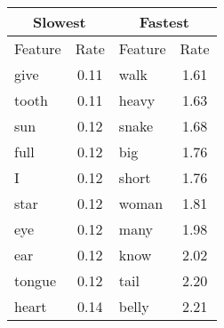 \begin{tabular}{|l|c||l|c|}
    \hline
    \multicolumn{2}{|c||}{Slowest} & \multicolumn{2}{|c|}{Fastest} \\ \hline
    Feature & Rate  & Feature & Rate \\ \hline
  give & 0.11 & walk & 1.61 \\ 
  tooth & 0.11 & heavy & 1.63 \\ 
  sun & 0.12 & snake & 1.68 \\ 
  full & 0.12 & big & 1.76 \\ 
  I & 0.12 & short & 1.76 \\ 
  star & 0.12 & woman & 1.81 \\ 
  eye & 0.12 & many & 1.98 \\ 
  ear & 0.12 & know & 2.02 \\ 
  tongue & 0.12 & tail & 2.20 \\ 
  heart & 0.14 & belly & 2.21 \\ 
\hline
\end{tabular}
